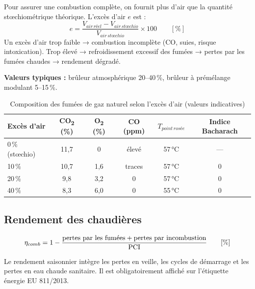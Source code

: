 \begin{definition}[title=Excès d'air]
Pour assurer une combustion complète, on fournit plus d'air que la quantité stœchiométrique théorique. L'excès d'air $e$ est :
\begin{equation}
  e = \frac{V_{air\,réel} - V_{air\,stœchio}}{V_{air\,stœchio}} \times 100 \qquad [\%]
\end{equation}
Un excès d'air trop faible → combustion incomplète (CO, suies, risque intoxication). Trop élevé → refroidissement excessif des fumées → pertes par les fumées chaudes → rendement dégradé.

\textbf{Valeurs typiques :} brûleur atmosphérique 20–40\,\%, brûleur à prémélange modulant 5–15\,\%.
\end{definition}

\begin{table}[H]
  \centering
  \caption{Composition des fumées de gaz naturel selon l'excès d'air (valeurs indicatives)}
  \begin{tabular}{lccccc}
    \toprule
    Excès d'air & CO\textsubscript{2} (\%) & O\textsubscript{2} (\%) & CO (ppm) & $T_{point\,rosée}$ & Indice Bacharach \\
    \midrule
    0\,\% (stœchio) & 11,7 & 0 & élevé & 57\,°C & — \\
    10\,\% & 10,7 & 1,6 & traces & 57\,°C & 0 \\
    20\,\% & 9,8 & 3,2 & 0 & 57\,°C & 0 \\
    40\,\% & 8,3 & 6,0 & 0 & 55\,°C & 0 \\
    \bottomrule
  \end{tabular}
\end{table}

\subsection{Rendement des chaudières}

\begin{definition}[title=Rendement de combustion]
\begin{equation}
  \eta_{comb} = 1 - \frac{\text{pertes par les fumées} + \text{pertes par incombus\-tion}}{\text{PCI}} \qquad [\%]
\end{equation}
\end{definition}

\begin{definition}[title=Rendement saisonnier (SCOP thermique)]
Le rendement saisonnier intègre les pertes en veille, les cycles de démarrage et les pertes en eau chaude sanitaire. Il est obligatoirement affiché sur l'étiquette énergie EU 811/2013.
\end{definition}

